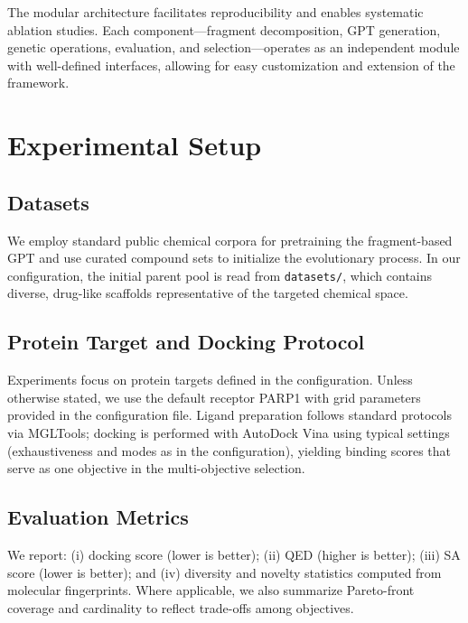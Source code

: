 \documentclass[lettersize,journal]{IEEEtran}
\begin{document}
The modular architecture facilitates reproducibility and enables systematic ablation studies. Each component—fragment decomposition, GPT generation, genetic operations, evaluation, and selection—operates as an independent module with well-defined interfaces, allowing for easy customization and extension of the framework.


\section{Experimental Setup}
\subsection{Datasets}
We employ standard public chemical corpora for pretraining the fragment-based GPT and use curated compound sets to initialize the evolutionary process. In our configuration, the initial parent pool is read from \texttt{datasets/}, which contains diverse, drug-like scaffolds representative of the targeted chemical space.
\subsection{Protein Target and Docking Protocol}
Experiments focus on protein targets defined in the configuration. Unless otherwise stated, we use the default receptor PARP1 with grid parameters provided in the configuration file. Ligand preparation follows standard protocols via MGLTools; docking is performed with AutoDock Vina using typical settings (exhaustiveness and modes as in the configuration), yielding binding scores that serve as one objective in the multi-objective selection.
\subsection{Evaluation Metrics}
We report: (i) docking score (lower is better); (ii) QED (higher is better); (iii) SA score (lower is better); and (iv) diversity and novelty statistics computed from molecular fingerprints. Where applicable, we also summarize Pareto-front coverage and cardinality to reflect trade-offs among objectives.
\end{document}

